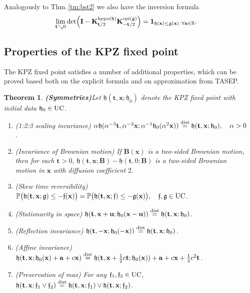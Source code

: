 \documentclass[letterpaper,reqno,11pt,oneside,final]{amsart}
\newtheorem{theorem}[thm]{Theorem}
\theoremstyle{definition}
\newcommand{\fh}{\mathfrak{h}}
\newcommand{\fg}{\mathfrak{g}}
\newcommand{\ff}{\mathfrak{f}}
\newcommand{\pp}{\mathbb{P}}
\newcommand{\rr}{\mathbb{R}}
\newcommand{\uno}[1]{\mathbf{1}_{#1}}
\newcommand{\tts}{\hspace{0.05em}}
\newcommand{\uptext}[1]{\text{\upshape{#1}}}
\DeclareMathOperator{\epi}{\uptext{epi}}
\DeclareMathOperator{\hypo}{\uptext{hypo}}
\DeclareMathOperator{\UC}{\uptext{UC}}
\newcommand{\ft}{\mathbf{t}}
\newcommand{\fx}{\mathbf{x}}
\newcommand{\fu}{\mathbf{u}}
\newcommand{\fa}{\mathbf{a}}
\newcommand{\fB}{\mathbf{B}}
\newcommand{\fK}{\mathbf{K}}
\newcommand{\fI}{\mathbf{I}}
\numberwithin{equation}{section}
\begin{document}
Analogously to Thm.\,\ref{tm:bst2} we also have the inversion formula 
\begin{equation}
\lim_{\ft\searrow0}\det\!\left(\fI-\fK^{\hypo(\fh)}_{\ft/2}\fK^{\epi(\fg)}_{-\ft/2}\right)=\uno{\fh(\fx)\leq\fg(\fx)~\forall\fx\in\rr}.\label{eq:contstatsinv}
\end{equation}

\subsection{Properties of the KPZ fixed point}\label{sec:properties} The KPZ fixed point satisfies a number of additional properties, which can be proved based both on the explicit formula and on approximation from TASEP.

\begin{theorem}{\bf (Symmetries)}\label{thm:sym}
\enspace Let $\fh(\ft,\fx; \fh_0)$ denote the KPZ fixed point with initial data $\fh_0\in \UC$.\\[-14pt]
\begin{enumerate}[label=\normalfont{(\roman*)},ref=\roman*]
\item \label{123a}  \emph{(1:2:3 scaling invariance)} \enspace
$\alpha\tts\fh(\alpha^{-3}\ft,\alpha^{-2}\fx;\alpha^{-1}\fh_0(\alpha^{2}\fx) )\stackrel{\uptext{dist}}{=} \fh(\ft, \fx;\fh_0), \quad \alpha>0$.
\item \label{ibm} \emph{(Invariance of Brownian motion)} \enspace  If $\fB(\fx)$ is a two-sided Brownian motion, then for each $\ft>0$, $\fh(\ft,\fx; \fB)-\fh(\ft,0;\fB)$ is a two-sided Brownian motion in $\fx$ with diffusion coefficient $2$.
\item  \label{str} \emph{(Skew time reversibility)} \enspace
$\pp\big(\fh(\ft,\fx; \fg)\le -\ff(\fx)\big) =\pp\big(\fh(\ft,\fx;\ff)\le -\fg(\fx)\big),\quad\ff,\fg\in\UC$.
\item \label{sis} \emph{(Stationarity in space)} \hskip0.1in$\fh(\ft,\fx+\fu; \fh_0(\fx-\fu))\stackrel{\uptext{dist}}{=} \fh(\ft,\fx; \fh_0)$.
\item  \label{ri} \emph{(Reflection invariance)} \hskip0.1in$\fh(\ft, -\fx;\fh_0(-\fx))\stackrel{\uptext{dist}}{=} \fh(\ft,\fx; \fh_0)$.
\item \label{ai} \emph{(Affine invariance)}  \hskip0.1in$\fh(\ft,\fx; \fh_0(\fx) + \fa + c\fx)\stackrel{\uptext{dist}}{=} \fh(\ft,\fx+\frac12c\ft; \fh_0(\fx)) + \fa + c\fx + \frac14c^2\ft$.
\item \label{pom} \emph{(Preservation of max)}
\enspace For any $\ff_1,\ff_2\in\UC$,
$\fh(\ft,\fx;\ff_1\vee \ff_2)\stackrel{\uptext{dist}}{=} \fh(\ft,\fx; \ff_1)\vee \fh(\ft,\fx; \ff_2)$.
\end{enumerate}
\end{theorem}
\end{document}
